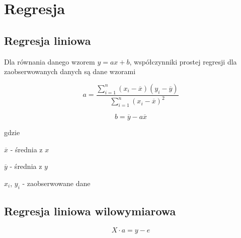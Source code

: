 \section*{Regresja}
\subsection*{Regresja liniowa}

Dla równania danego wzorem $y = ax + b$, współczynniki prostej regresji
dla zaobserwowanych danych są dane wzorami

\begin{equation*}
    a = \frac{\sum_{i=1}^{n} 
    (x_i - \overline{x})
    (y_i - \overline{y})}
    {\sum_{i=1}^{n} (x_i - \overline{x})^2}
\end{equation*}

\vspace{1em}

\begin{equation*}
    b = \overline{y} - a \overline{x}
\end{equation*}

gdzie

$\overline{x}$ - średnia z $x$

$\overline{y}$ - średnia z $y$

$x_i$, $y_i$ - zaobserwowane dane

\subsection*{Regresja liniowa wilowymiarowa}

\begin{equation*}
    X \cdot a = y - e
\end{equation*}

